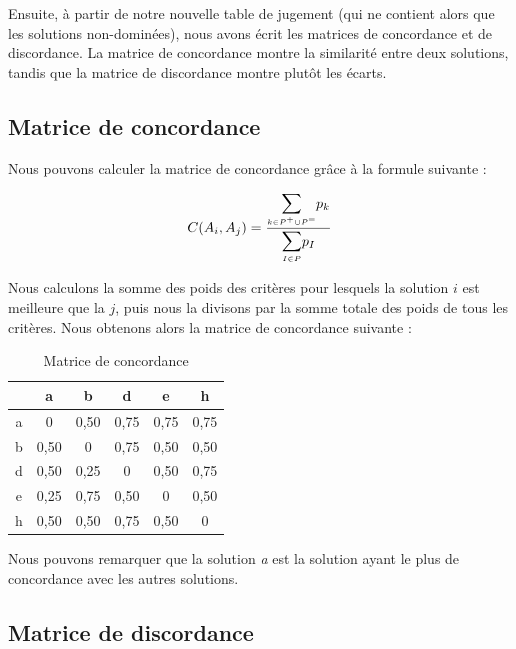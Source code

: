 \documentclass[paper=a4, fontsize=11pt]{report}
\numberwithin{equation}{section}		%
\numberwithin{figure}{section}			%
\numberwithin{table}{section}				%
\begin{document}
Ensuite, à partir de notre nouvelle table de jugement (qui ne contient alors que les solutions non-dominées), nous avons écrit les matrices de concordance et de discordance. La matrice de concordance montre la similarité entre deux solutions, tandis que la matrice de discordance montre plutôt les écarts.\\

\subsection{Matrice de concordance}

Nous pouvons calculer la matrice de concordance grâce à la formule suivante :

\begin{equation*}
C(A_i, A_j) = \frac{\mathlarger{\mathlarger{\sum}}\limits_{\mathsmaller{k \in P^+ \cup P^=}} p_k}{\mathlarger{\mathlarger{\sum}}\limits_{\mathsmaller{I \in P}} p_I}
\end{equation*} 

Nous calculons la somme des poids des critères pour lesquels la solution $i$ est meilleure que la $j$, puis nous la divisons par la somme totale des poids de tous les critères. Nous obtenons alors la matrice de concordance suivante : \\

\begin{table}[H]
\begin{center}
\begin{tabular}{c|ccccc}
 & a & b & d & e & h \\ 
\hline 
a & 0 & 0,50 & 0,75 & 0,75 & 0,75 \\ 
b & 0,50 & 0 & 0,75 & 0,50 & 0,50 \\ 
d & 0,50 & 0,25 & 0 & 0,50 & 0,75 \\ 
e & 0,25 & 0,75 & 0,50 & 0 & 0,50 \\ 
h & 0,50 & 0,50 & 0,75 & 0,50 & 0\\ 
\end{tabular} 
\caption{Matrice de concordance} 
\end{center}
\end{table}

Nous pouvons remarquer que la solution \textit{a} est la solution ayant le plus de concordance avec les autres solutions.

\subsection{Matrice de discordance} 
\end{document}
